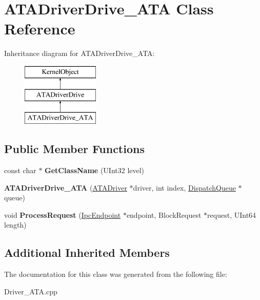 \hypertarget{class_a_t_a_driver_drive___a_t_a}{}\section{A\+T\+A\+Driver\+Drive\+\_\+\+A\+TA Class Reference}
\label{class_a_t_a_driver_drive___a_t_a}
Inheritance diagram for A\+T\+A\+Driver\+Drive\+\_\+\+A\+TA\+:\begin{figure}[H]
\begin{center}
\leavevmode
\includegraphics[height=3.000000cm]{class_a_t_a_driver_drive___a_t_a}
\end{center}
\end{figure}
\subsection*{Public Member Functions}
\begin{DoxyCompactItemize}
\item 
\mbox{\label{class_a_t_a_driver_drive___a_t_a_aebd5ce9d0b960c477c5016e5c1875cae}} 
const char $\ast$ {\bfseries Get\+Class\+Name} (U\+Int32 level)
\item 
\mbox{\label{class_a_t_a_driver_drive___a_t_a_aea19e3107997411345a133c4a9ac5fe3}} 
{\bfseries A\+T\+A\+Driver\+Drive\+\_\+\+A\+TA} (\hyperlink{class_a_t_a_driver}{A\+T\+A\+Driver} $\ast$driver, int index, \hyperlink{class_dispatch_queue}{Dispatch\+Queue} $\ast$queue)
\item 
\mbox{\label{class_a_t_a_driver_drive___a_t_a_a630b62e187dd6eb85c69c85c0ec5ce3d}} 
void {\bfseries Process\+Request} (\hyperlink{class_ipc_endpoint}{Ipc\+Endpoint} $\ast$endpoint, Block\+Request $\ast$request, U\+Int64 length)
\end{DoxyCompactItemize}
\subsection*{Additional Inherited Members}


The documentation for this class was generated from the following file\+:\begin{DoxyCompactItemize}
\item 
Driver\+\_\+\+A\+T\+A.\+cpp\end{DoxyCompactItemize}
